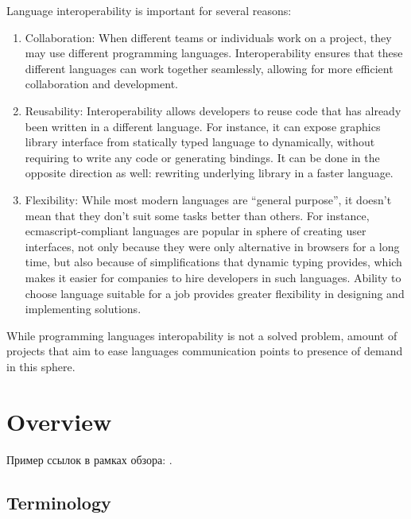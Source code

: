 \documentclass[times, %
			   specification,annotation, %
			   titlepage-extra-ru,specification-extra-ru,annotation-extra-ru, %
			   languages={russian,english} %
			  ]{itmo-student-thesis}
\begin{document}
\tableofcontents

\startprefacepage

Language interoperability is important for several reasons:

\begin{enumerate}
\item Collaboration: When different teams or individuals work on a project, they may use different programming languages. Interoperability ensures that these different languages can work together seamlessly, allowing for more efficient collaboration and development.

\item Reusability: Interoperability allows developers to reuse code that has already been written in a different language. For instance, it can expose graphics library interface from statically typed language to dynamically, without requiring to write any code or generating bindings. It can be done in the opposite direction as well: rewriting underlying library in a faster language.

\item Flexibility: While most modern languages are ``general purpose'', it doesn't mean that they don't suit some tasks better than others. For instance, ecmascript-compliant languages are popular in sphere of creating user interfaces, not only because they were only alternative in browsers for a long time, but also because of simplifications that dynamic typing provides, which makes it easier for companies to hire developers in such languages. Ability to choose language suitable for a job provides greater flexibility in designing and implementing solutions.
\end{enumerate}

While programming languages interopability is not a solved problem, amount of projects that aim to ease languages communication points to presence of demand in this sphere.

\chapter{Overview}

\startrelatedwork
Пример ссылок в рамках обзора: \cite{example-english, example-russian, unrestricted-jump-evco, doerr-doerr-lambda-lambda-self-adjustment-arxiv}.

\section{Terminology}
\TODO
\end{document}

